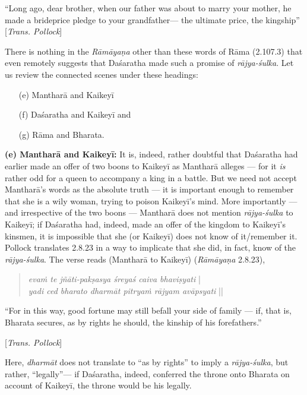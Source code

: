 \begin{myquote}
“Long ago, dear brother, when our father was about to marry your mother, he made a brideprice pledge to your grandfather--- the ultimate price, the kingship” [{\sl Trans. Pollock}]
\end{myquote}

There is nothing in the {\sl Rāmāyaṇa} other than these words of Rāma (2.107.3) that even remotely suggests that Daśaratha made such a promise of {\sl rājya-śulka}. Let us review the connected scenes under these headings: 
\begin{itemize}
\itemsep=0pt
\item[(e)] Mantharā and Kaikeyī 
\item[(f)] Daśaratha and Kaikeyī and 
\item[(g)] Rāma and Bharata.
\end{itemize}

\noindent
\textbf{(e) Mantharā and Kaikeyī:} It is, indeed, rather doubtful that Daśaratha had earlier made an offer of two boons to Kaikeyī as Mantharā alleges --- for it {\sl is} rather odd for a queen to accompany a king in a battle. But we need not accept Mantharā’s words as the absolute truth --- it is important enough to remember that she is a wily woman, trying to poison Kaikeyī’s mind.  More importantly --- and irrespective of the two boons --- Mantharā does not mention {\sl rājya-śulka} to Kaikeyī; if Daśaratha had, indeed, made an offer of the kingdom to Kaikeyī’s kinsmen, it is impossible that she (or Kaikeyī) does not know of it/remember it. Pollock translates 2.8.23 in a way to implicate that she did, in fact, know of the {\sl rājya-śulka}. The verse reads (Mantharā to Kaikeyī) ({\sl Rāmāyaṇa} 2.8.23), 
\begin{quote}
{{\sl evaṁ te jñāti-pakṣasya śreyaś caiva bhaviṣyati}} |\\
{\sl yadi ced bharato dharmāt pitryaṁ rājyam avāpsyati} || 
\end{quote}

\begin{myquote}
 “For in this way, good fortune may still befall your side of family --- if, that is, Bharata secures, as by rights he should, the kinship of his forefathers.” 

\hfill [{\sl Trans. Pollock}]
\end{myquote}

Here, {\sl dharmāt} does not translate to “as by rights” to imply a {\sl rājya-śulka}, but rather, “legally”--- if Daśaratha, indeed, conferred the throne onto Bharata on account of Kaikeyī, the throne would be his legally. 

